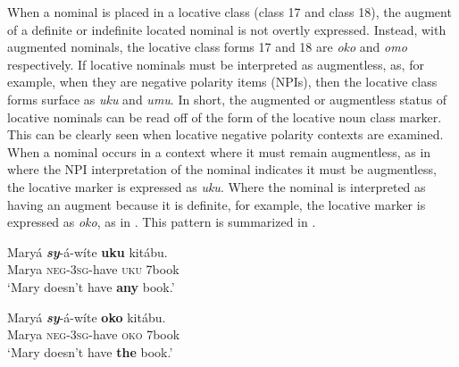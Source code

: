 \documentclass[output=paper]{langscibook}
\begin{document}
When a nominal is placed in a locative class (class 17 and class 18), the augment of a definite or indefinite located nominal is not overtly expressed. Instead, with augmented nominals, the locative class forms 17 and 18 are \textit{oko} and \textit{omo} respectively. If locative nominals must be interpreted as augmentless, as, for example, when they are negative polarity items (NPIs), then the locative class forms surface as \textit{uku} and \textit{umu}. In short, the augmented or augmentless status of locative nominals can be read off of the form of the locative noun class marker. This can be clearly seen when locative negative polarity contexts are examined. When a nominal occurs in a context where it must remain augmentless, as in  where the NPI interpretation of the nominal indicates it must be augmentless, the locative marker is expressed as \textit{uku}. Where the nominal is interpreted as having an augment because it is definite, for example, the locative marker is expressed as \textit{oko}, as in . This pattern is summarized in .

\ea \label{ex:schneider:augments}
\begin{xlist}

\ex \label{ex:schneider:augmentnpi}
\gll Maryá \textbf{\textit{sy}}-á-wíte \textbf{uku} kitábu.\\
Marya \textsc{neg-3sg}-have \textsc{uku} 7book\\
\glt  `Mary doesn't have \textbf{any} book.'

\ex \label{ex:schneider:augmentdef}
\gll Maryá \textbf{\textit{sy}}-á-wíte \textbf{oko} kitábu.\\
Marya \textsc{neg-3sg}-have \textsc{oko} 7book\\
\glt  `Mary doesn't have \textbf{the} book.'

\end{xlist}
\z 
\end{document}
